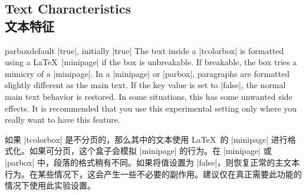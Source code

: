 \setcounter{section}{4}
\setcounter{subsection}{17}
\setcounter{subsubsection}{0}
\subsection{Text Characteristics\\文本特征}

\begin{docTcbKey}[][doc updated=2015-10-14]{parbox}{}{default |true|, initially |true|}
The text inside a |tcolorbox| is formatted using a \LaTeX\ |minipage|
if the box is unbreakable. 
If breakable, the box tries a mimicry of a |minipage|. 
In a |minipage| or |parbox|, paragraphs are formatted slightly different
as the main text. If the key value is set to |false|, the normal main text
behavior is restored. In some situations, this has some unwanted side
effects. It is recommended that you use this experimental setting only
where you really want to have this feature.

如果 |tcolorbox| 是不分页的，那么其中的文本使用 \LaTeX\ 的 |minipage| 进行格式化。如果可分页，这个盒子会模拟 |minipage| 的行为。在 |minipage| 或 |parbox| 中，段落的格式稍有不同。如果将值设置为 |false|，则恢复正常的主文本行为。在某些情况下，这会产生一些不必要的副作用。建议仅在真正需要此功能的情况下使用此实验设置。

\end{docTcbKey}

\begin{dispListing}

\begin{tcolorbox}[parbox,adjusted title={parbox=true (normal)}]
\lipsum[1-2]
\end{tcolorbox}\hfill%
\begin{tcolorbox}[parbox=false,adjusted title={parbox=false}]
\lipsum[1-2]
\end{tcolorbox}%
\end{dispListing}
{\tcbusetemp}

